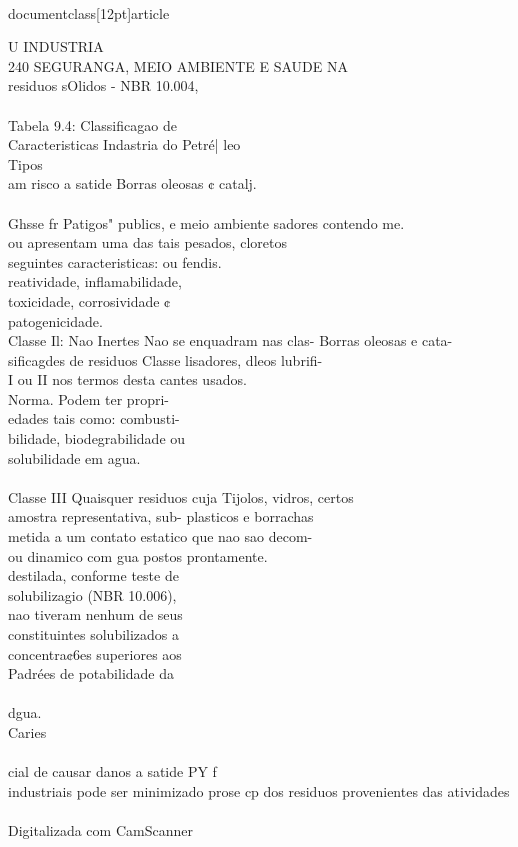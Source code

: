 \\documentclass[12pt]{article}
\begin{document}
U INDUSTRIA\\
240 SEGURANGA, MEIO AMBIENTE E SAUDE NA\\
residuos sOlidos - NBR 10.004,\\
\\
Tabela 9.4: Classificagao de\\
Caracteristicas Indastria do Petré| leo\\
Tipos\\
am risco a satide Borras oleosas ¢ catalj.\\
\\
Ghsse fr Patigos" publics, e meio ambiente sadores contendo me.\\
ou apresentam uma das tais pesados, cloretos\\
seguintes caracteristicas: ou fendis.\\
reatividade, inflamabilidade,\\
toxicidade, corrosividade ¢\\
patogenicidade.\\
Classe Il: Nao Inertes Nao se enquadram nas clas- Borras oleosas e cata-\\
sificagdes de residuos Classe lisadores, dleos lubrifi-\\
I ou II nos termos desta cantes usados.\\
Norma. Podem ter propri-\\
edades tais como: combusti-\\
bilidade, biodegrabilidade ou\\
solubilidade em agua.\\
\\
Classe III Quaisquer residuos  cuja Tijolos, vidros, certos\\
amostra representativa, sub- plasticos e borrachas\\
metida a um contato estatico que nao sao decom-\\
ou dinamico com gua postos prontamente.\\
destilada, conforme teste de\\
solubilizagio (NBR 10.006),\\
nao tiveram nenhum de seus\\
constituintes solubilizados a\\
concentra¢6es superiores aos\\
Padrées de potabilidade da\\
\\
dgua.\\
Caries\\
\\
cial de causar danos a satide PY f\\
industriais pode ser minimizado prose cp dos residuos provenientes das atividades\\
\\
Digitalizada com CamScanner\\
\end{document}
